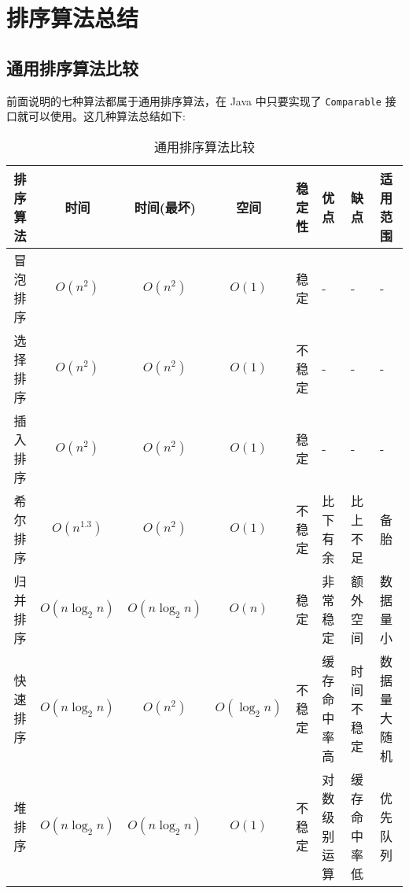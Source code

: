 \section{排序算法总结}

\subsection{通用排序算法比较}

前面说明的七种算法都属于通用排序算法，在 Java 中只要实现了 \texttt{Comparable} 接口就可以使用。这几种算法总结如下:

\begin{table}[H]
    \small
    \centering
    \caption{通用排序算法比较}
    \label{table:通用排序算法比较}
    \setlength{\tabcolsep}{2mm}
    \begin{tabular}{c|ccccp{2.25cm}p{2.25cm}p{2.25cm}}
        \toprule
        \textbf{排序算法} & \textbf{时间} & \textbf{时间(最坏)} & \textbf{空间} & \textbf{稳定性} & \textbf{优点} & \textbf{缺点} & \textbf{适用范围} \\
        \midrule
        冒泡排序 & $O(n^2)$ & $O(n^2)$ & $O(1)$ & 稳定 & - & - & - \\
        选择排序 & $O(n^2)$ & $O(n^2)$ & $O(1)$ & 不稳定 & - & - & - \\
        插入排序 & $O(n^2)$ & $O(n^2)$ & $O(1)$ & 稳定 & - & - & - \\
        \midrule
        希尔排序 & $O(n^{1.3})$ & $O(n^2)$ & $O(1)$ & 不稳定 & 比下有余 & 比上不足 & 备胎 \\
        \midrule
        归并排序 & $O(n \log_2 n)$ & $O(n \log_2 n)$ & $O(n)$ & 稳定 & 非常稳定 & 额外空间 & 数据量小 \\
        快速排序 & $O(n \log_2 n)$ & $O(n^2)$ & $O(\log_2 n)$ & 不稳定 & 缓存命中率高 & 时间不稳定 & 数据量大随机 \\
        堆排序 & $O(n \log_2 n)$ & $O(n \log_2 n)$ & $O(1)$ & 不稳定 & 对数级别运算 & 缓存命中率低 & 优先队列 \\
        \bottomrule
    \end{tabular}
\end{table}